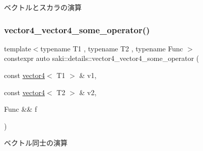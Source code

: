 ベクトルとスカラの演算 

\mbox{\label{namespacesaki_1_1details_a059dd5f75d9b1f557f4125e09c15d16c}} 
\subsubsection{\texorpdfstring{vector4\+\_\+vector4\+\_\+some\+\_\+operator()}{vector4\_vector4\_some\_operator()}}
{\footnotesize\ttfamily template$<$typename T1 , typename T2 , typename Func $>$ \\
constexpr auto saki\+::details\+::vector4\+\_\+vector4\+\_\+some\+\_\+operator (\begin{DoxyParamCaption}\item[{const \mbox{\hyperlink{classsaki_1_1vector4}{vector4}}$<$ T1 $>$ \&}]{v1,  }\item[{const \mbox{\hyperlink{classsaki_1_1vector4}{vector4}}$<$ T2 $>$ \&}]{v2,  }\item[{Func \&\&}]{f }\end{DoxyParamCaption})}



ベクトル同士の演算 

